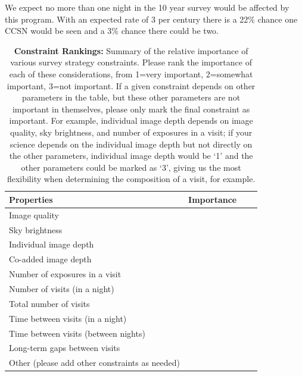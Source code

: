 \documentclass[12pt, letterpaper]{article}
\begin{document}
We expect no more than one night in the 10 year survey would be
affected by this program. With an expected rate of 3 per century there
is a 22\% chance one CCSN would be seen and a 3\% chance there could
be two.

\vspace{.3in}

\begin{table}[ht]
    \centering
    \begin{tabular}{l|l|l|l}
        \toprule
        Properties & Importance \hspace{.3in} \\
        \midrule
        Image quality &     \\
        Sky brightness &  \\
        Individual image depth &   \\
        Co-added image depth &   \\
        Number of exposures in a visit   &   \\
        Number of visits (in a night)  &   \\ 
        Total number of visits &   \\
        Time between visits (in a night) &  \\
        Time between visits (between nights)  &   \\
        Long-term gaps between visits & \\
        Other (please add other constraints as needed) & \\
        \bottomrule
    \end{tabular}
    \caption{{\bf Constraint Rankings:} Summary of the relative importance of various survey strategy constraints. Please rank the importance of each of these considerations, from 1=very important, 2=somewhat important, 3=not important. If a given constraint depends on other parameters in the table, but these other parameters are not important in themselves, please only mark the final constraint as important. For example, individual image depth depends on image quality, sky brightness, and number of exposures in a visit; if your science depends on the individual image depth but not directly on the other parameters, individual image depth would be `1' and the other parameters could be marked as `3', giving us the most flexibility when determining the composition of a visit, for example.}
        \label{tab:obs_constraints}
\end{table}
\end{document}
